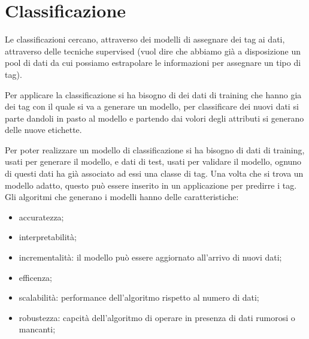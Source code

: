 \documentclass[12pt]{article}
\begin{document}
\newpage
\section{Classificazione}
Le classificazioni cercano, attraverso dei modelli di assegnare dei tag ai dati, attraverso delle tecniche supervised (vuol dire che abbiamo gi\`a a disposizione un pool di dati da cui possiamo estrapolare le informazioni per assegnare un tipo di tag).

Per applicare la classificazione si ha bisogno di dei dati di training che hanno gia dei tag con il quale si va a generare un modello, per classificare dei nuovi dati si parte dandoli in pasto al modello e partendo dai volori degli attributi si generano delle nuove etichette.

Per poter realizzare un modello di classificazione si ha bisogno di dati di training, usati per generare il modello, e dati di test, usati per validare il modello, ognuno di questi dati ha gi\`a associato ad essi una classe di tag. Una volta che si trova un modello adatto, questo pu\`o essere inserito in un applicazione per predirre i tag. Gli algoritmi che generano i modelli hanno delle caratteristiche:
\begin{itemize}
    \item accuratezza;
    \item interpretabilit\`a;
    \item incrementalit\`a: il modello pu\`o essere aggiornato all'arrivo di nuovi dati;
    \item efficenza;
    \item scalabilit\`a: performance dell'algoritmo rispetto al numero di dati;
    \item robustezza: capcit\`a dell'algoritmo di operare in presenza di dati rumorosi o mancanti;
\end{itemize}
\end{document}
